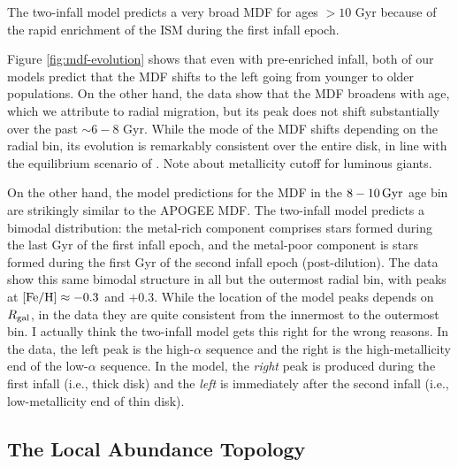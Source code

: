 \documentclass[twocolumn,twocolappendix,linenumbers]{aastex631}
\newcommand{\todo}[1]{{\color{red}#1}}
\newcommand{\mathFeH}{{\rm [Fe/H]}}
\begin{document}
The two-infall model predicts a very broad MDF for ages $>10$ Gyr because of the rapid enrichment of the ISM during the first infall epoch.

Figure \ref{fig:mdf-evolution} shows that even with pre-enriched infall, both of our models predict that the MDF shifts to the left going from younger to older populations. On the other hand, the data show that the MDF broadens with age, which we attribute to radial migration, but its peak does not shift substantially over the past $\sim6-8$ Gyr. While the mode of the MDF shifts depending on the radial bin, its evolution is remarkably consistent over the entire disk, in line with the equilibrium scenario of \citet{johnson_milky_2024}.
\todo{Note about metallicity cutoff for luminous giants.}

On the other hand, the model predictions for the MDF in the $8-10\,{\rm Gyr}$ age bin are strikingly similar to the APOGEE MDF. The two-infall model predicts a bimodal distribution: the metal-rich component comprises stars formed during the last Gyr of the first infall epoch, and the metal-poor component is stars formed during the first Gyr of the second infall epoch (post-dilution). The data show this same bimodal structure in all but the outermost radial bin, with peaks at $\mathFeH\approx-0.3$ and $+0.3$. While the location of the model peaks depends on $R_{\rm gal}$, in the data they are quite consistent from the innermost to the outermost bin. \todo{I actually think the two-infall model gets this right for the wrong reasons. In the data, the left peak is the high-$\alpha$ sequence and the right is the high-metallicity end of the low-$\alpha$ sequence. In the model, the {\it right} peak is produced during the first infall (i.e., thick disk) and the {\it left} is immediately after the second infall (i.e., low-metallicity end of thin disk).}

\subsection{The Local Abundance Topology}
\label{sec:abundance-distributions}
\end{document}
